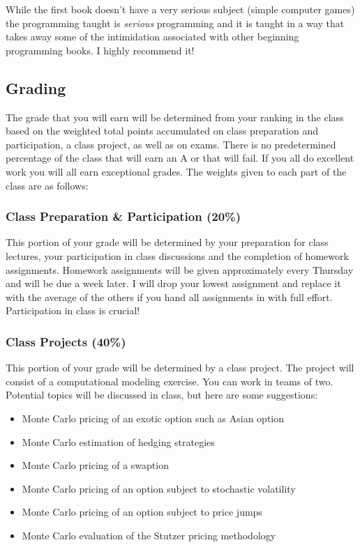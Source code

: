 \documentclass[]{article}
\begin{document}
While the first book doesn't have a very serious subject (simple
computer games) the programming taught is \emph{serious} programming and
it is taught in a way that takes away some of the intimidation
associated with other beginning programming books. I highly recommend
it!

\subsection{Grading}\label{grading}

The grade that you will earn will be determined from your ranking in the
class based on the weighted total points accumulated on class
preparation and participation, a class project, as well as on exams.
There is no predetermined percentage of the class that will earn an A or
that will fail. If you all do excellent work you will all earn
exceptional grades. The weights given to each part of the class are as
follows:

\subsubsection{Class Preparation \& Participation
(20\%)}\label{class-preparation-participation-20}

This portion of your grade will be determined by your preparation for
class lectures, your participation in class discussions and the
completion of homework assignments. Homework assignments will be given
approximately every Thursday and will be due a week later. I will drop
your lowest assignment and replace it with the average of the others if
you hand all assignments in with full effort. Participation in class is
crucial!

\subsubsection{Class Projects (40\%)}\label{class-projects-40}

This portion of your grade will be determined by a class project. The
project will consist of a computational modeling exercise. You can work
in teams of two. Potential topics will be discussed in class, but here
are some suggestions:

\begin{itemize}
\itemsep1pt\parskip0pt
\item
  Monte Carlo pricing of an exotic option such as Asian option
\item
  Monte Carlo estimation of hedging strategies
\item
  Monte Carlo pricing of a swaption
\item
  Monte Carlo pricing of an option subject to stochastic volatility
\item
  Monte Carlo pricing of an option subject to price jumps
\item
  Monte Carlo evaluation of the Stutzer pricing methodology
\end{itemize}
\end{document}
